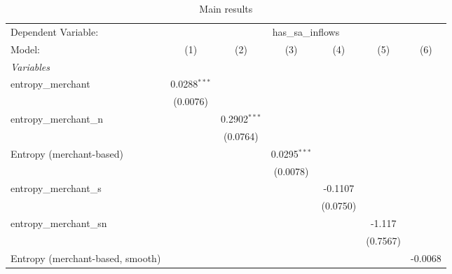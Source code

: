 
\begin{table}[htbp]
   \centering
   \caption{\label{tab:reg_has_sa_inflows_merchant.tex} Main results}
   \begin{footnotesize}
      \begin{tabular}{lcccccc}
         \tabularnewline\midrule\midrule
         Dependent Variable: & \multicolumn{6}{c}{has\_sa\_inflows}\\
         Model:                           & (1)            & (2)            & (3)            & (4)            & (5)            & (6)\\
         \midrule \emph{Variables} &   &   &   &   &   &  \\
         entropy\_merchant               & 0.0288$^{***}$ &                &                &                &                &   \\
                                          & (0.0076)       &                &                &                &                &   \\
         entropy\_merchant\_n           &                & 0.2902$^{***}$ &                &                &                &   \\
                                          &                & (0.0764)       &                &                &                &   \\
         Entropy (merchant-based)         &                &                & 0.0295$^{***}$ &                &                &   \\
                                          &                &                & (0.0078)       &                &                &   \\
         entropy\_merchant\_s           &                &                &                & -0.1107        &                &   \\
                                          &                &                &                & (0.0750)       &                &   \\
         entropy\_merchant\_sn          &                &                &                &                & -1.117         &   \\
                                          &                &                &                &                & (0.7567)       &   \\
         Entropy (merchant-based, smooth) &                &                &                &                &                & -0.0068\\

\end{tabular}
\end{footnotesize}
\end{table}
